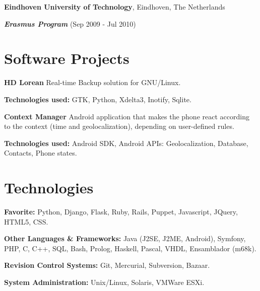 \documentclass[margin,line]{resume}
\begin{document}
\begin{resume}
{\bf Eindhoven University of Technology}, Eindhoven, The Netherlands\\
\vspace*{-.1in}
\begin{list1}
\item[] {\bf \em Erasmus Program} (Sep 2009 - Jul 2010) 
\end{list1}

\vspace{+.2in}
\section{\sc Software Projects } 
\begin{list1}
\item[] {\bf HD Lorean}
Real-time Backup solution for GNU/Linux.
\vspace*{.05in}
\begin{list2}
\item {\bf Technologies used:} GTK, Python, Xdelta3, Inotify, Sqlite.\\
\end{list2} 

\item[] {\bf Context Manager}
Android application that makes the phone react according to the context 
(time and geolocalization), depending on user-defined rules.
\vspace*{+.03in}
\begin{list2}
\item {\bf Technologies used:} Android SDK, Android APIs: Geolocalization, 
Database, Contacts, Phone states.
\end{list2}
\end{list1}

\vspace{+.2in}
\section{\sc Technologies} 
\begin{list1}
\item[]{\bf Favorite:}  Python, Django, Flask, Ruby, Rails, Puppet, Javascript, JQuery, HTML5, CSS. 
\item[]{\bf Other Languages \& Frameworks:} Java (J2SE, J2ME, Android), Symfony, PHP, C, C++, SQL, Bash, Prolog, Haskell, Pascal, VHDL, Ensamblador (m68k).
\item[]{\bf Revision Control Systems:} Git, Mercurial, Subversion, Bazaar.
\item[]{\bf System Administration:} Unix/Linux, Solaris, VMWare ESXi.
\end{list1}


\end{resume}
\end{document}
